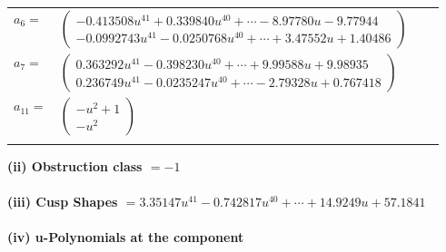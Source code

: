 \documentclass[1p]{elsarticle_modified}
\theoremstyle{definition}
\begin{document}
\begin{tabular}{m{7pt} m{180pt} m{7pt} m{180pt} }
\flushright $a_{6}=$&$\begin{pmatrix}-0.413508 u^{41}+0.339840 u^{40}+\cdots-8.97780 u-9.77944\\-0.0992743 u^{41}-0.0250768 u^{40}+\cdots+3.47552 u+1.40486\end{pmatrix}$ \\
\flushright $a_{7}=$&$\begin{pmatrix}0.363292 u^{41}-0.398230 u^{40}+\cdots+9.99588 u+9.98935\\0.236749 u^{41}-0.0235247 u^{40}+\cdots-2.79328 u+0.767418\end{pmatrix}$ \\
\flushright $a_{11}=$&$\begin{pmatrix}- u^2+1\\- u^2\end{pmatrix}$\\&\end{tabular}
\flushleft \textbf{(ii) Obstruction class $= -1$}\\~\\
\flushleft \textbf{(iii) Cusp Shapes $= 3.35147 u^{41}-0.742817 u^{40}+\cdots+14.9249 u+57.1841$}\\~\\
\newpage\renewcommand{\arraystretch}{1}
\flushleft \textbf{(iv) u-Polynomials at the component}\newline \\
\end{document}
